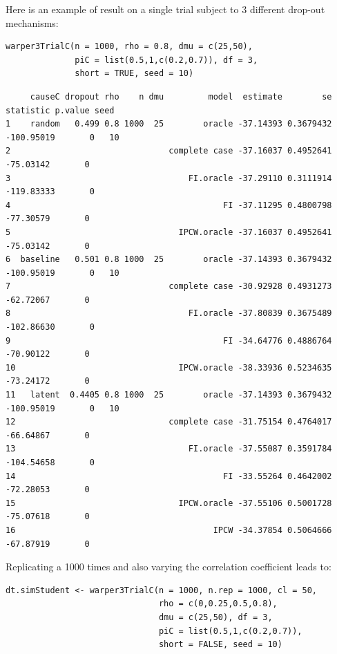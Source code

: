 \documentclass[12pt]{article}
\begin{document}
Here is an example of result on a single trial subject to 3 different
drop-out mechanisms:
\lstset{language=r,label= ,caption= ,captionpos=b,numbers=none}
\begin{lstlisting}
warper3TrialC(n = 1000, rho = 0.8, dmu = c(25,50),
              piC = list(0.5,1,c(0.2,0.7)), df = 3,
              short = TRUE, seed = 10)
\end{lstlisting}

\begin{verbatim}
     causeC dropout rho    n dmu         model  estimate        se  statistic p.value seed
1    random   0.499 0.8 1000  25        oracle -37.14393 0.3679432 -100.95019       0   10
2                                complete case -37.16037 0.4952641  -75.03142       0     
3                                    FI.oracle -37.29110 0.3111914 -119.83333       0     
4                                           FI -37.11295 0.4800798  -77.30579       0     
5                                  IPCW.oracle -37.16037 0.4952641  -75.03142       0     
6  baseline   0.501 0.8 1000  25        oracle -37.14393 0.3679432 -100.95019       0   10
7                                complete case -30.92928 0.4931273  -62.72067       0     
8                                    FI.oracle -37.80839 0.3675489 -102.86630       0     
9                                           FI -34.64776 0.4886764  -70.90122       0     
10                                 IPCW.oracle -38.33936 0.5234635  -73.24172       0     
11   latent  0.4405 0.8 1000  25        oracle -37.14393 0.3679432 -100.95019       0   10
12                               complete case -31.75154 0.4764017  -66.64867       0     
13                                   FI.oracle -37.55087 0.3591784 -104.54658       0     
14                                          FI -33.55264 0.4642002  -72.28053       0     
15                                 IPCW.oracle -37.55106 0.5001728  -75.07618       0     
16                                        IPCW -34.37854 0.5064666  -67.87919       0
\end{verbatim}

Replicating a 1000 times and also varying the correlation coefficient leads to:
\lstset{language=r,label= ,caption= ,captionpos=b,numbers=none}
\begin{lstlisting}
dt.simStudent <- warper3TrialC(n = 1000, n.rep = 1000, cl = 50,
                               rho = c(0,0.25,0.5,0.8),
                               dmu = c(25,50), df = 3,
                               piC = list(0.5,1,c(0.2,0.7)), 
                               short = FALSE, seed = 10)
\end{lstlisting}
\end{document}
